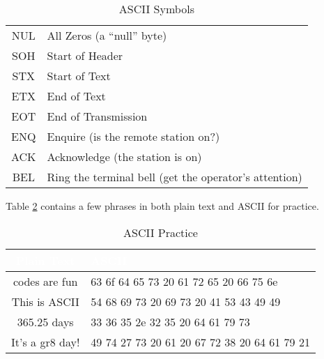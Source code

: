 \begin{table}[H]
  \sffamily
  \newcommand{\head}[1]{\textcolor{white}{\textbf{#1}}}    
  \begin{center}
    \begin{tabular}{ c l } 
      \hline \hline %
      {NUL} & {All Zeros (a ``null'' byte)} \\
      {SOH} & {Start of Header} \\
      {STX} & {Start of Text} \\
      {ETX} & {End of Text} \\
      {EOT} & {End of Transmission} \\
      {ENQ} & {Enquire (is the remote station on?)} \\
      {ACK} & {Acknowledge (the station is on)} \\
      {BEL} & {Ring the terminal bell (get the operator's attention)} \\
      \hline  
    \end{tabular}
  \end{center}
  \caption{ASCII Symbols}
  \label{MO:tab:ascii_symbols}
\end{table}

Table \ref{MO:tab:ascii_practice} contains a few phrases in both plain text and ASCII for practice.

\begin{table}[H]
  \sffamily
  \newcommand{\head}[1]{\textcolor{white}{\textbf{#1}}}    
  \begin{center}
    \begin{tabular}{ c l } 
      \hline
      \rowcolor{black!75}
      {\head{Plain Text}} & {\head{ASCII}} \\
      \hline    
      {codes are fun} & {63 6f 64 65 73 20 61 72 65 20 66 75 6e} \\
      {This is ASCII} & {54 68 69 73 20 69 73 20 41 53 43 49 49} \\
      {365.25 days} & {33 36 35 2e 32 35 20 64 61 79 73} \\
      {It's a gr8 day!} & {49 74 27 73 20 61 20 67 72 38 20 64 61 79 21} \\
      \hline  
    \end{tabular}
  \end{center}
  \caption{ASCII Practice}
  \label{MO:tab:ascii_practice}
\end{table}

